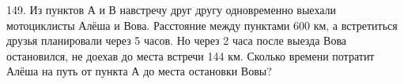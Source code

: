 149. Из пунктов А и В навстречу друг другу одновременно выехали мотоциклисты Алёша и Вова. Расстояние между пунктами 600 км, а встретиться друзья планировали через 5 часов. Но через 2 часа после выезда Вова остановился, не доехав до места встречи 144 км. Сколько времени потратит Алёша на путь от пункта А до места остановки Вовы?\\
